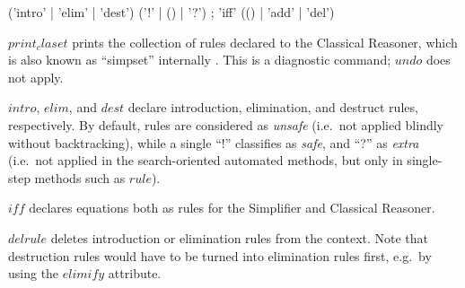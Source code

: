 \begin{rail}
  ('intro' | 'elim' | 'dest') ('!' | () | '?')
  ;
  'iff' (() | 'add' | 'del')
\end{rail}

\begin{descr}
\item [$print_claset$] prints the collection of rules declared to the
  Classical Reasoner, which is also known as ``simpset'' internally
  \cite{isabelle-ref}.  This is a diagnostic command; $undo$ does not apply.
\item [$intro$, $elim$, and $dest$] declare introduction, elimination, and
  destruct rules, respectively.  By default, rules are considered as
  \emph{unsafe} (i.e.\ not applied blindly without backtracking), while a
  single ``!'' classifies as \emph{safe}, and ``?'' as \emph{extra} (i.e.\ not
  applied in the search-oriented automated methods, but only in single-step
  methods such as $rule$).

\item [$iff$] declares equations both as rules for the Simplifier and
  Classical Reasoner.

\item [$delrule$] deletes introduction or elimination rules from the context.
  Note that destruction rules would have to be turned into elimination rules
  first, e.g.\ by using the $elimify$ attribute.
\end{descr}


